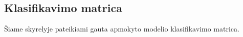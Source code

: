 \subsection{Klasifikavimo matrica}
\label{subsec:klasifikavimo_matrica}

Šiame skyrelyje pateikiami gauta apmokyto modelio klasifikavimo matrica.